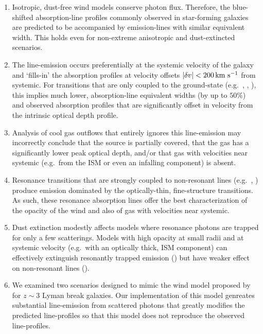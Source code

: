 \documentclass[]{emulateapj}
\begin{document}
\begin{enumerate}

\item Isotropic, dust-free wind models conserve photon flux.
  Therefore, the blue-shifted absorption-line profiles commonly
  observed in star-forming galaxies are predicted to be accompanied by
  emission-lines with similar equivalent width.  This holds even for
  non-extreme anisotropic and dust-extincted scenarios.

\item The line-emission occurs preferentially at the systemic velocity
  of the galaxy and `fills-in' the absorption profiles at velocity
  offsets $|\delta v| < 200 \, {\rm km~s^{-1}}$ from systemic.  For transitions that
  are only coupled to the ground-state (e.g.\ , \lya,
  ),  this implies much lower, absorption-line equivalent widths (by up to
  $50\%$) and observed absorption profiles that are significantly offset in velocity
  from the intrinsic optical depth profile.

\item Analysis of cool gas outflows that entirely ignores this
  line-emission may incorrectly conclude that the source is partially
  covered, that the gas has a significantly lower peak optical depth, and/or that 
  gas with velocities near systemic (e.g.\ from the ISM or even
  an infalling component) is absent.   


\item Resonance transitions that are strongly coupled to
  non-resonant lines (e.g.\ , ) 
  produce emission dominated by the
  optically-thin, fine-structure transitions.  As such, these resonance
  absorption lines offer the best
  characterization of the opacity of the wind and also of gas 
  with velocities near systemic.  

\item  Dust extinction modestly affects 
  models where resonance photons are trapped for only a few scatterings.  Models
  with high opacity at small radii and at systemic velocity (e.g.\ with an
  optically thick, ISM component)  can effectively extinguish
  resonantly trapped emission () but have weaker
  effect on non-resonant lines (\feiis).

\item We examined two scenarios designed to mimic the wind model
  proposed by \cite{steidel+10} for $z \sim 3$ Lyman break galaxies.  Our
  implementation of this model genreates substantial line-emission
  from scattered photons that greatly modifies the predicted
  line-profiles so that this model does not reproduce the observed
  line-profiles. 


\end{enumerate}
\end{document}
